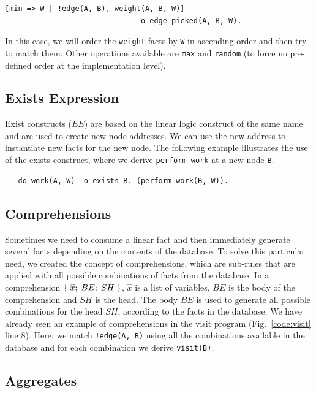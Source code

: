 \begin{Verbatim}
[min => W | !edge(A, B), weight(A, B, W)]
                              -o edge-picked(A, B, W).
\end{Verbatim}

In this case, we will order the \texttt{weight} facts by \texttt{W} in ascending order and then try
to match them. Other operations available are \texttt{max} and \texttt{random} (to force no pre-defined order at the
implementation level).

\subsection{Exists Expression}

Exist constructs ($EE$) are based on the linear logic construct of the same name and are used to create new node addresses. We can use the new address to instantiate new facts for the new node.  
The following example illustrates the use of the exists construct, where we derive
\texttt{perform-work} at a new node \texttt{B}.

\begin{Verbatim}
   do-work(A, W) -o exists B. (perform-work(B, W)).
\end{Verbatim}

\subsection{Comprehensions}

Sometimes we need to consume a linear fact and then immediately generate several facts depending on
the contents of the database. To solve this particular need, we created the concept of comprehensions, which are
sub-rules that are applied with all possible combinations of facts from the database. In a comprehension $\{ \; \widehat{x}; \; BE; \; SH \; \}$,
$\widehat{x}$ is a list of variables, $BE$ is the body of the comprehension and $SH$ is the head.
The body $BE$ is used to generate all possible combinations for the head $SH$, according to the facts
in the database.
We have already seen an example of comprehensions in the visit program (Fig.~\ref{code:visit} line 8).
Here, we match \texttt{!edge(A, B)} using all the combinations
available in the database and for each combination we derive \texttt{visit(B)}.

\subsection{Aggregates}

